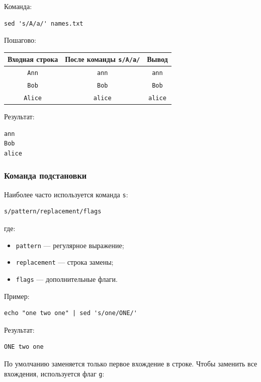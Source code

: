 \documentclass[12pt,a4paper]{article}
\begin{document}
Команда:

\begin{verbatim}
sed 's/A/a/' names.txt
\end{verbatim}

Пошагово:

\begin{center}
\begin{tabular}{|c|c|c|}
\hline
Входная строка & После команды \texttt{s/A/a/} & Вывод \\
\hline
\texttt{Ann} & \texttt{ann} & \texttt{ann} \\
\hline
\texttt{Bob} & \texttt{Bob} & \texttt{Bob} \\
\hline
\texttt{Alice} & \texttt{alice} & \texttt{alice} \\
\hline
\end{tabular}
\end{center}

Результат:

\begin{verbatim}
ann
Bob
alice
\end{verbatim}

\subsubsection{Команда подстановки}

Наиболее часто используется команда \texttt{s}:

\begin{verbatim}
s/pattern/replacement/flags
\end{verbatim}

где:

\begin{itemize}
    \item \texttt{pattern} --- регулярное выражение;
    \item \texttt{replacement} --- строка замены;
    \item \texttt{flags} --- дополнительные флаги.
\end{itemize}

Пример:

\begin{verbatim}
echo "one two one" | sed 's/one/ONE/'
\end{verbatim}

Результат:

\begin{verbatim}
ONE two one
\end{verbatim}

По умолчанию заменяется только первое вхождение в строке. Чтобы заменить все вхождения, используется флаг \texttt{g}:
\end{document}
